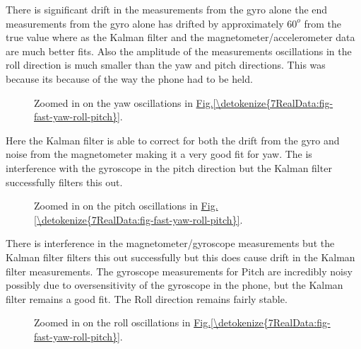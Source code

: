 \documentclass[letterpaper,10pt,english]{jupyterBook}
\begin{document}
\sphinxAtStartPar
There is significant drift in the measurements from the gyro alone the end measurements from the gyro alone has drifted by approximately \(60^o\) from the true value where as the Kalman filter and the magnetometer/accelerometer data are much better fits. Also the amplitude of the measurements oscillations in the roll direction is much smaller than the yaw and pitch directions. This was because its because of the way the phone had to be held.

\begin{figure}[htbp]
\centering
\capstart

\noindent{}
\caption{Zoomed in on the yaw oscillations in \hyperref[\detokenize{7RealData:fig-fast-yaw-roll-pitch}]{Fig.\@ \ref{\detokenize{7RealData:fig-fast-yaw-roll-pitch}}}.}\label{\detokenize{7RealData:fig-fast-yaw-roll-pitch-2}}\end{figure}

\sphinxAtStartPar
Here the Kalman filter is able to correct for both the drift from the gyro and noise from the magnetometer making it a very good fit for yaw. The is interference with the gyroscope in the pitch direction but the Kalman filter successfully filters this out.

\begin{figure}[htbp]
\centering
\capstart

\noindent{}
\caption{Zoomed in on the pitch oscillations in \hyperref[\detokenize{7RealData:fig-fast-yaw-roll-pitch}]{Fig.\@ \ref{\detokenize{7RealData:fig-fast-yaw-roll-pitch}}}.}\label{\detokenize{7RealData:id1}}\end{figure}

\sphinxAtStartPar
There is interference in the magnetometer/gyroscope measurements but the Kalman filter filters this out successfully but this does cause drift in the Kalman filter measurements. The gyroscope measurements for Pitch are incredibly noisy possibly due to oversensitivity of the gyroscope in the phone, but the Kalman filter remains a good fit. The Roll direction remains fairly stable.

\begin{figure}[htbp]
\centering
\capstart

\noindent{}
\caption{Zoomed in on the roll oscillations in \hyperref[\detokenize{7RealData:fig-fast-yaw-roll-pitch}]{Fig.\@ \ref{\detokenize{7RealData:fig-fast-yaw-roll-pitch}}}.}\label{\detokenize{7RealData:id2}}\end{figure}
\end{document}
